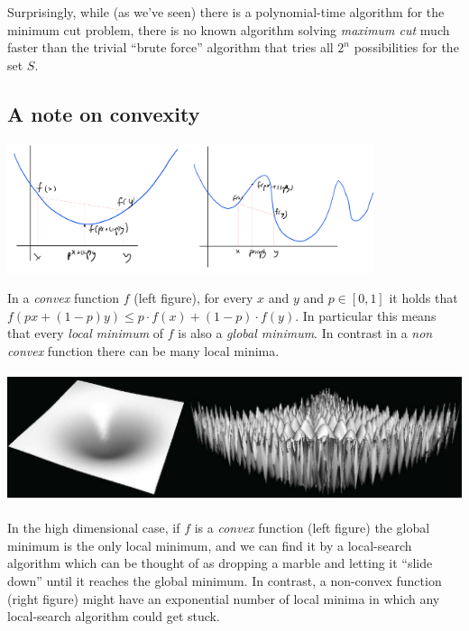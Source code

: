 Surprisingly, while (as we've seen) there is a polynomial-time algorithm
for the minimum cut problem, there is no known algorithm solving
\emph{maximum cut} much faster than the trivial ``brute force''
algorithm that tries all \(2^n\) possibilities for the set \(S\).

\subsection{A note on convexity}\label{A-note-on-convexity}


\begin{marginfigure}
\centering
\includegraphics[width=\linewidth, height=1.5in, keepaspectratio]{../figure/convexvsnot.png}
\caption{In a \emph{convex} function \(f\) (left figure), for every
\(x\) and \(y\) and \(p\in [0,1]\) it holds that
\(f(px+(1-p)y) \leq p\cdot f(x)+(1-p)\cdot f(y)\). In particular this
means that every \emph{local minimum} of \(f\) is also a \emph{global
minimum}. In contrast in a \emph{non convex} function there can be many
local minima.}
\label{convexdeffig}
\end{marginfigure}


\begin{marginfigure}
\centering
\includegraphics[width=\linewidth, height=1.5in, keepaspectratio]{../figure/convexandnon.jpg}
\caption{In the high dimensional case, if \(f\) is a \emph{convex}
function (left figure) the global minimum is the only local minimum, and
we can find it by a local-search algorithm which can be thought of as
dropping a marble and letting it ``slide down'' until it reaches the
global minimum. In contrast, a non-convex function (right figure) might
have an exponential number of local minima in which any local-search
algorithm could get stuck.}
\label{convexfunctionfig}
\end{marginfigure}

